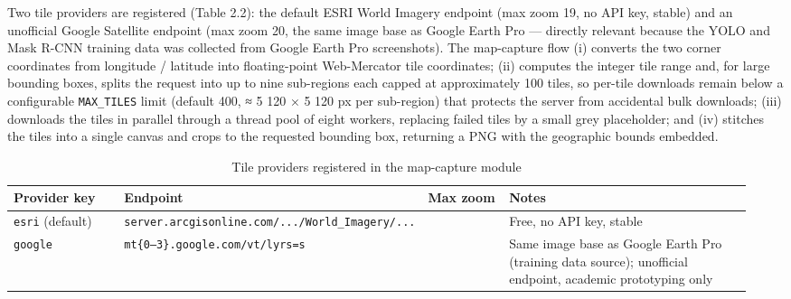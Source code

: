 Two tile providers are registered (Table 2.2): the default ESRI World Imagery endpoint (max zoom 19, no API key, stable) and an unofficial Google Satellite endpoint (max zoom 20, the same image base as Google Earth Pro --- directly relevant because the YOLO and Mask R-CNN training data was collected from Google Earth Pro screenshots). The map-capture flow (i) converts the two corner coordinates from longitude / latitude into floating-point Web-Mercator tile coordinates; (ii) computes the integer tile range and, for large bounding boxes, splits the request into up to nine sub-regions each capped at approximately 100 tiles, so per-tile downloads remain below a configurable \texttt{MAX\_TILES} limit (default 400, ≈ 5 120 × 5 120 px per sub-region) that protects the server from accidental bulk downloads; (iii) downloads the tiles in parallel through a thread pool of eight workers, replacing failed tiles by a small grey placeholder; and (iv) stitches the tiles into a single canvas and crops to the requested bounding box, returning a PNG with the geographic bounds embedded.

\begin{longtable}[]{@{}>{\raggedright\arraybackslash}p{0.158\linewidth} >{\raggedright\arraybackslash}p{0.338\linewidth} >{\raggedright\arraybackslash}p{0.117\linewidth} >{\raggedright\arraybackslash}p{0.338\linewidth}@{}}
\caption{Tile providers registered in the map-capture module}\\
\endfirsthead

\toprule\noalign{}
\textbf{Provider key} & \textbf{Endpoint} & \textbf{Max zoom} & \textbf{Notes} \\
\midrule\noalign{}
\endhead
\bottomrule\noalign{}
\endlastfoot
\texttt{esri} (default) & \texttt{server.arcgisonline.com/.../World\_Imagery/...} & 19 & Free, no API key, stable \\
\texttt{google} & \texttt{mt\{0–3\}.google.com/vt/lyrs=s} & 20 & Same image base as Google Earth Pro (training data source); unofficial endpoint, academic prototyping only \\
\end{longtable}

